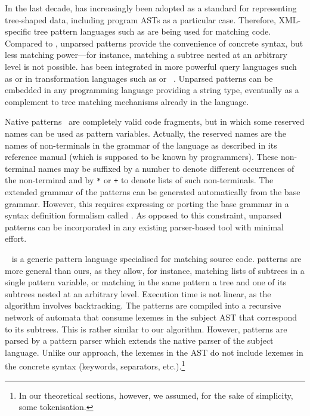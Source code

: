 In the last decade, \XML has increasingly been adopted as a standard
for representing tree\hyp{}shaped data, including program ASTs as a
particular case. Therefore, \textsf{XML}\hyp{}specific tree pattern
languages such as \XPath are being used for matching code. Compared to
\XPath, unparsed patterns provide the convenience of concrete syntax,
but less matching power---for instance, matching a subtree nested at
an arbitrary level is not possible. \XPath has been integrated in more
powerful query languages such as \XQuery or in transformation
languages such as \XSLT or \CDuce~\cite{cduce}. Unparsed patterns can
be embedded in any programming language providing a string type,
eventually as a complement to tree matching mechanisms already in the
language.

Native patterns~\cite{native} are completely valid code fragments, but
in which some reserved names can be used as pattern
variables. Actually, the reserved names are the names of
non\hyp{}terminals in the grammar of the language as described in its
reference manual (which is supposed to be known by programmers). These
non\hyp{}terminal names may be suffixed by a number to denote
different occurrences of the non\hyp{}terminal and by \texttt{*} or
\texttt{+} to denote lists of such non\hyp{}terminals. The extended
grammar of the patterns can be generated automatically from the base
grammar. However, this requires expressing or porting the base grammar
in a syntax definition formalism called \SDF. As opposed to this
constraint, unparsed patterns can be incorporated in any existing
parser\hyp{}based tool with minimal effort.

\Scruple~\cite{scruple} is a generic pattern language specialised for
matching source code. \Scruple patterns are more general than ours, as
they allow, for instance, matching lists of subtrees in a single
pattern variable, or matching in the same pattern a tree and one of
its subtrees nested at an arbitrary level. Execution time is not
linear, as the algorithm involves backtracking. The patterns are
compiled into a recursive network of automata that consume lexemes in
the subject AST that correspond to its subtrees. This is rather
similar to our algorithm. However, \Scruple patterns are parsed by a
pattern parser which extends the native parser of the subject
language. Unlike our approach, the lexemes in the AST do not include
lexemes in the concrete syntax (keywords, separators,
etc.).\footnote{In our theoretical sections, however, we assumed, for
the sake of simplicity, some tokenisation.}

